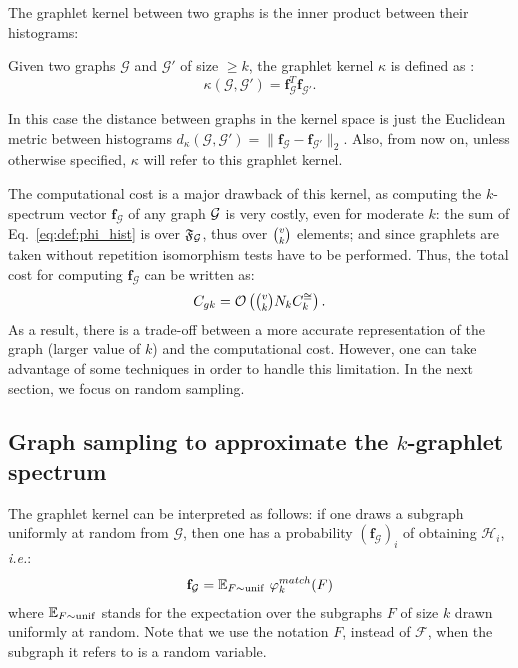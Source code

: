 The graphlet kernel between two graphs is the inner product between their histograms:
\begin{definition}
	Given two graphs $\mathcal{G}$ and $\mathcal{G}'$ of size $\geq k$, the graphlet kernel $\kappa$ is defined as \citep{graphlet_kernel}:
	\begin{equation}
	\label{eq:graphlet_kernel}
	\kappa(\mathcal{G},\mathcal{G}')=\mathbf{f}_{\mathcal{G}}^T \mathbf{f}_{\mathcal{G}'}.
	\end{equation}
\end{definition}
In this case the distance between graphs in the kernel space is just the Euclidean metric between histograms $d_\kappa({\mathcal{G}},{\mathcal{G}'}) = \|\mathbf{f}_{\mathcal{G}} - \mathbf{f}_{{\mathcal{G}'}}\|_2$. Also, from now on, unless otherwise specified, $\kappa$ will refer to this graphlet kernel. 

The computational cost is a major drawback of this kernel, as computing the $k$-spectrum vector $\mathbf{f}_{\mathcal{G}}$ of any graph $\mathcal{G}$ is very costly, even for moderate $k$: the sum of Eq.~\eqref{eq:def:phi_hist} is over $\mathfrak{F}_{\mathcal{G}}$, thus over $\tbinom{v}{k}$ elements; and since graphlets are taken without repetition isomorphism tests have to be performed. Thus, the total cost for computing $\mathbf{f}_{\mathcal{G}}$ can be written as:
\begin{equation}
\label{eq:cost_graphlet}
C_{gk}= \mathcal{O}\left(\tbinom{v}{k} N_k C^{\cong}_k\right).
\end{equation}
As a result, there is a trade-off between a more accurate representation of the graph (larger value of $k$) and the computational cost. However, one can take advantage of some techniques in order to handle this limitation. In the next section, we focus on random sampling.

\subsection{Graph sampling to approximate the $k$-graphlet spectrum}
\label{graph_sampling}

The graphlet kernel can be interpreted as follows: if one draws a subgraph uniformly at random from $\mathcal{G}$, then one has a probability $(\mathbf{f}_\mathcal{G})_i$ of obtaining $\mathcal{H}_i$, \emph{i.e.}:
\begin{align}
	\label{eq:histo_unif}
	\mathbf{f}_\mathcal{G} = \mathbb{E}_{F \sim {\rm unif}} ~\varphi^{match}_k(F)
\end{align}
where $\mathbb{E}_{F \sim {\rm unif}}$ stands for the expectation over the subgraphs $F$ of size $k$ drawn uniformly at random. Note that we use the notation $F$, instead of $\mathcal{F}$, when the subgraph it refers to is a random variable. 

